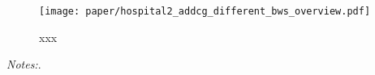 \begin{landscape}
	\vspace*{\fill}
	\begin{figure}[H]\centering\caption{xxx}\label{fig_mlch: add_cg}
		\texttt{[image: paper/hospital2\_addcg\_different\_bws\_overview.pdf]}
	\end{figure}
	\scriptsize
	\begin{minipage}{0.9\linewidth}
		\emph{Notes:}.
	\end{minipage}
	\vspace*{\fill}\clearpage
\end{landscape}







